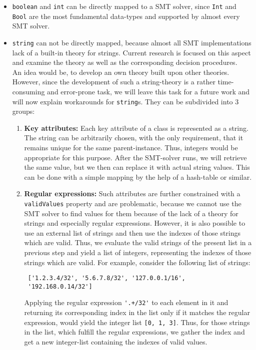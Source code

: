 \begin{itemize}
 \item \verb|boolean| and \verb|int| can be directly mapped to a SMT solver, since \verb|Int| and \verb|Bool| are the most fundamental data-types and supported by almost every SMT solver.


 \item \verb|string| can not be directly mapped, because almost all SMT implementations lack of a built-in theory for strings. Current research is focused on this aspect and examine the theory as well as the corresponding decision procedures.\\

 An idea would be, to develop an own theory built upon other theories. However, since the development of such a string-theory is a rather time-consuming and error-prone task, we will leave this task for a future work and will now explain workarounds for \verb|string|s. They can be subdivided into 3 groups:
 \begin{enumerate}
  \item \textbf{Key attributes:} Each key attribute of a class is represented as a string. The string can be arbitrarily chosen, with the only requirement, that it remains unique for the same parent-instance. Thus, integers would be appropriate for this purpose. After the SMT-solver runs, we will retrieve the same value, but we then can replace it with actual string values. This can be done with a simple mapping by the help of a hash-table or similar.
 
  \item \textbf{Regular expressions:} Such attributes are further constrained with a \verb|validValues| property and are problematic, because we cannot use the SMT solver to find values for them because of the lack of a theory for strings and especially regular expressions. However, it is also possible to use an external list of strings and then use the indexes of those strings which are valid. Thus, we evaluate the valid strings of the present list in a previous step and yield a list of integers, representing the indexes of those strings which are valid. For example, consider the following list of strings: \begin{verbatim}
 ['1.2.3.4/32', '5.6.7.8/32', '127.0.0.1/16', 
 '192.168.0.14/32']
 \end{verbatim}
  Applying the regular expression \verb|'.+/32'| to each element in it and returning its corresponding index in the list only if it matches the regular expression, would yield the integer list \verb|[0, 1, 3]|. Thus, for those strings in the list, which fulfill the regular expressions, we gather the index and get a new integer-list containing the indexes of valid values.
 

\end{enumerate}
\end{itemize}
